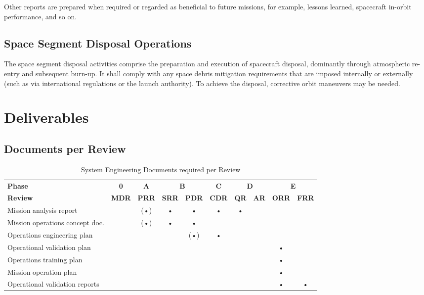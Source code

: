 Other reports are prepared when required or regarded as beneficial to future missions, for example, lessons learned, spacecraft in-orbit performance, and so on.

\subsection{Space Segment Disposal Operations}

The space segment disposal activities comprise the preparation and execution of spacecraft disposal, dominantly through atmospheric re-entry and subsequent burn-up. It shall comply with any space debris mitigation requirements that are imposed internally or externally (such as via international regulations or the launch authority). To achieve the disposal, corrective orbit maneuvers may be needed.

\section{Deliverables}
\label{sec:Mission Operations Deliverables}

\subsection{Documents per Review}

\begin{table}[h]
\centering
\begin{tabular}{l c c c c c c c c c}
\toprule
\textbf{Phase} & \textbf{0} & \textbf{A} & \multicolumn{2}{c}{\textbf{B}} & \textbf{C} & \multicolumn{2}{c}{\textbf{D}} & \multicolumn{2}{c}{\textbf{E}} \\
\textbf{Review} & \textbf{MDR} & \textbf{PRR} & \textbf{SRR} & \textbf{PDR} & \textbf{CDR} & \textbf{QR} & \textbf{AR} & \textbf{ORR} & \textbf{FRR} \\
\midrule
Mission analysis report     	&   &(•)& • & • & • & • &   &   &   \\
\hline
Mission operations concept doc.	&   &(•)& • & • &   &   &   &   &   \\
\hline
Operations engineering plan    	&   &   &   &(•)& • &   &   &   &   \\
\hline
Operational validation plan	    &   &   &   &   &   &   &   & • &   \\
\hline
Operations training plan        &   &   &   &   &   &   &   & • &   \\
\hline
Mission operation plan			&   &   &   &   &   &   &   & • &   \\
\hline
Operational validation reports  &   &   &   &   &   &   &   & • & • \\
\bottomrule
\end{tabular}
\caption{System Engineering Documents required per Review}
\end{table}

